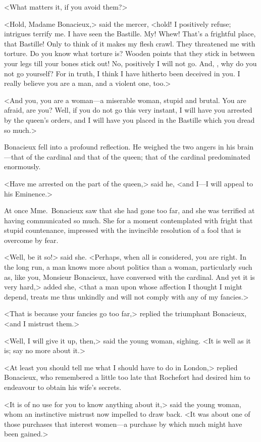 <What matters it, if you avoid them?> 

<Hold, Madame Bonacieux,> said the mercer, <hold! I positively refuse; intrigues terrify me. I have seen the Bastille. My! Whew! That's a frightful place, that Bastille! Only to think of it makes my flesh crawl. They threatened me with torture. Do you know what torture is? Wooden points that they stick in between your legs till your bones stick out! No, positively I will not go. And, , why do you not go yourself? For in truth, I think I have hitherto been deceived in you. I really believe you are a man, and a violent one, too.> 

<And you, you are a woman—a miserable woman, stupid and brutal. You are afraid, are you? Well, if you do not go this very instant, I will have you arrested by the queen's orders, and I will have you placed in the Bastille which you dread so much.> 

Bonacieux fell into a profound reflection. He weighed the two angers in his brain—that of the cardinal and that of the queen; that of the cardinal predominated enormously. 

<Have me arrested on the part of the queen,> said he, <and I—I will appeal to his Eminence.> 

At once Mme.~Bonacieux saw that she had gone too far, and she was terrified at having communicated so much. She for a moment contemplated with fright that stupid countenance, impressed with the invincible resolution of a fool that is overcome by fear. 

<Well, be it so!> said she. <Perhaps, when all is considered, you are right. In the long run, a man knows more about politics than a woman, particularly such as, like you, Monsieur Bonacieux, have conversed with the cardinal. And yet it is very hard,> added she, <that a man upon whose affection I thought I might depend, treats me thus unkindly and will not comply with any of my fancies.> 

<That is because your fancies go too far,> replied the triumphant Bonacieux, <and I mistrust them.> 

<Well, I will give it up, then,> said the young woman, sighing. <It is well as it is; say no more about it.> 

<At least you should tell me what I should have to do in London,> replied Bonacieux, who remembered a little too late that Rochefort had desired him to endeavour to obtain his wife's secrets. 

<It is of no use for you to know anything about it,> said the young woman, whom an instinctive mistrust now impelled to draw back. <It was about one of those purchases that interest women—a purchase by which much might have been gained.> 

